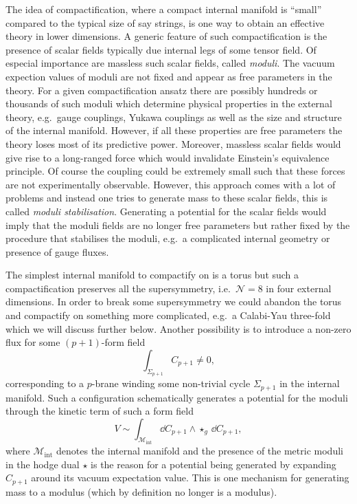 The idea of compactification, where a compact internal manifold is ``small'' compared to the typical size of say strings, is one way to obtain an effective theory in lower dimensions. A generic feature of such compactification is the presence of scalar fields typically due internal legs of some tensor field. Of especial importance are massless such scalar fields, called \emph{moduli}. The vacuum expection values of moduli are not fixed and appear as free parameters in the theory. For a given compactification ansatz there are possibly hundreds or thousands of such moduli which determine physical properties in the external theory, e.g.\ gauge couplings, Yukawa couplings as well as the size and structure of the internal manifold. However, if all these properties are free parameters the theory loses most of its predictive power. Moreover, massless scalar fields would give rise to a long-ranged force which would invalidate Einstein's equivalence principle. Of course the coupling could be extremely small such that these forces are not experimentally observable. However, this approach comes with a lot of problems and instead one tries to generate mass to these scalar fields, this is called \emph{moduli stabilisation}. Generating a potential for the scalar fields would imply that the moduli fields are no longer free parameters but rather fixed by the procedure that stabilises the moduli, e.g.\ a complicated internal geometry or presence of gauge fluxes. 

The simplest internal manifold to compactify on is a torus but such a compactification preserves all the supersymmetry, i.e.\ $\mathcal{N}=8$ in four external dimensions. In order to break some supersymmetry we could abandon the torus and compactify on something more complicated, e.g.\ a Calabi-Yau three-fold which we will discuss further below. Another possibility is to introduce a non-zero flux for some $(p+1)$-form field 
\begin{equation}
    \int_{\Sigma_{p+1}}C_{p+1}\neq 0,
\end{equation}
corresponding to a $p$-brane winding some non-trivial cycle $\Sigma_{p+1}$ in the internal manifold. Such a configuration schematically generates a potential for the moduli through the kinetic term of such a form field 
\begin{equation}
    V\sim \int_{\mathcal{M}_{\text{int}}} \dd C_{p+1}\wedge \star_{g}\,\dd C_{p+1}, 
\end{equation}
where $\mathcal{M}_\text{int}$ denotes the internal manifold and the presence of the metric moduli in the hodge dual $\star$ is the reason for a potential being generated by expanding $C_{p+1}$ around its vacuum expectation value. This is one mechanism for generating mass to a modulus (which by definition no longer is a modulus). 

